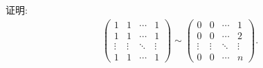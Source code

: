 \documentclass[../../main.tex]{subfiles}
\begin{document}
\begin{example}
证明:
\begin{align*}
\begin{pmatrix}
1 & 1 & \cdots & 1 \\
1 & 1 & \cdots & 1 \\
\vdots & \vdots & \ddots & \vdots \\
1 & 1 & \cdots & 1
\end{pmatrix}
\sim
\begin{pmatrix}
0 & 0 & \cdots & 1 \\
0 & 0 & \cdots & 2 \\
\vdots & \vdots & \ddots & \vdots \\
0 & 0 & \cdots & n
\end{pmatrix}.
\end{align*} 
\end{example}
\end{document}
